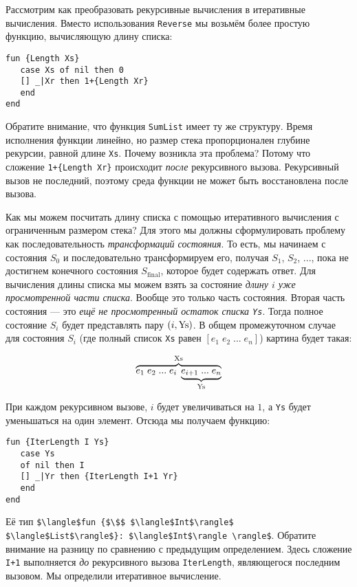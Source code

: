 Рассмотрим как преобразовать рекурсивные вычисления в итеративные вычисления. Вместо использования \lstinline!Reverse! мы возьмём более простую функцию, вычисляющую длину списка:

\begin{lstlisting}
fun {Length Xs}
   case Xs of nil then 0
   [] _|Xr then 1+{Length Xr}
   end
end
\end{lstlisting}

Обратите внимание, что функция \lstinline!SumList! имеет ту же структуру. Время исполнения функции линейно, но размер стека пропорционален глубине рекурсии, равной длине \lstinline!Xs!. Почему возникла эта проблема? Потому что сложение \lstinline!1+{Length Xr}! происходит \emph{после} рекурсивного вызова. Рекурсивный вызов не последний, поэтому среда функции не может быть восстановлена после вызова.

Как мы можем посчитать длину списка с помощью итеративного вычисления с ограниченным размером стека? Для этого мы должны сформулировать проблему как последовательность \emph{трансформаций состояния}. То есть, мы начинаем с состояния $S_0$ и последовательно трансформируем его, получая $S_1$, $S_2$, ..., пока не достигнем конечного состояния $S_\text{final}$, которое будет содержать ответ. Для вычисления длины списка мы можем взять за состояние \emph{длину $i$ уже просмотренной части списка}. Вообще это только часть состояния. Вторая часть состояния --- это \emph{ещё не просмотренный остаток списка \lstinline!Ys!}. Тогда полное состояние $S_i$ будет представлять пару $(i, \text{\lstinline!Ys!})$. В общем промежуточном случае для состояния $S_i$ (где полный список \lstinline!Xs! равен $[e_1 \; e_2 \; ... \; e_n]$) картина будет такая:

$$\overbrace{e_1 \; e_2 \; ... \; e_i \; \underbrace{e_{i+1} \; ... \; e_n}_{\text{\lstinline!Ys!}}} ^ \text{\lstinline!Xs!}$$

При каждом рекурсивном вызове, $i$ будет увеличиваться на $1$, а \lstinline!Ys! будет уменьшаться на один элемент. Отсюда мы получаем функцию:

\begin{lstlisting}
fun {IterLength I Ys}
   case Ys
   of nil then I
   [] _|Yr then {IterLength I+1 Yr}
   end
end
\end{lstlisting}

Её тип \lstinline!$\langle$fun {$\$$ $\langle$Int$\rangle$ $\langle$List$\rangle$}: $\langle$Int$\rangle \rangle$!. Обратите внимание на разницу по сравнению с предыдущим определением. Здесь сложение \lstinline!I+1! выполняется \emph{до} рекурсивного вызова \lstinline!IterLength!, являющегося последним вызовом. Мы определили итеративное вычисление.

